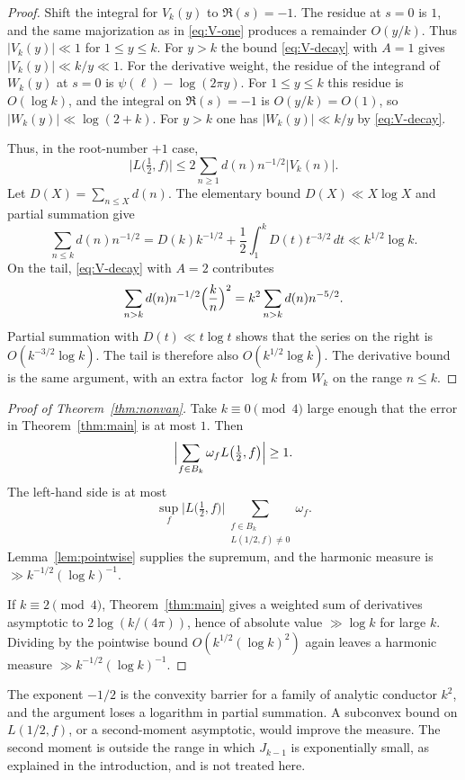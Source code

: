\documentclass[11pt]{amsart}
\theoremstyle{definition}
\theoremstyle{remark}
\numberwithin{equation}{section}
\begin{document}
\begin{proof}
Shift the integral for $V_k(y)$ to $\Re(s)=-1$. The residue at $s=0$ is $1$, and the same majorization as in \eqref{eq:V-one} produces a remainder $O(y/k)$. Thus $\lvert V_k(y)\rvert\ll 1$ for $1\le y\le k$. For $y>k$ the bound \eqref{eq:V-decay} with $A=1$ gives $\lvert V_k(y)\rvert\ll k/y\ll 1$. For the derivative weight, the residue of the integrand of $W_k(y)$ at $s=0$ is $\psi(\ell)-\log(2\pi y)$. For $1\le y\le k$ this residue is $O(\log k)$, and the integral on $\Re(s)=-1$ is $O(y/k)=O(1)$, so $\lvert W_k(y)\rvert\ll\log(2+k)$. For $y>k$ one has $\lvert W_k(y)\rvert\ll k/y$ by \eqref{eq:V-decay}.

Thus, in the root-number $+1$ case,
\[
\bigl\lvert L\bigl(\tfrac12,f\bigr)\bigr\rvert
\le 2\sum_{n\ge 1}d(n)n^{-1/2}\lvert V_k(n)\rvert.
\]
Let $D(X)=\sum_{n\le X}d(n)$. The elementary bound $D(X)\ll X\log X$ and partial summation give
\[
\sum_{n\le k}d(n)n^{-1/2}
=D(k)k^{-1/2}+\frac12\int_1^k D(t)t^{-3/2}\,dt
\ll k^{1/2}\log k.
\]
On the tail, \eqref{eq:V-decay} with $A=2$ contributes
\[
\sum_{n>k}d(n)n^{-1/2}\Bigl(\frac kn\Bigr)^2
=k^2\sum_{n>k}d(n)n^{-5/2}.
\]
Partial summation with $D(t)\ll t\log t$ shows that the series on the right is $O(k^{-3/2}\log k)$.
The tail is therefore also $O(k^{1/2}\log k)$.
The derivative bound is the same argument, with an extra factor $\log k$ from $W_k$ on the range $n\le k$.
\end{proof}

\begin{proof}[Proof of Theorem~\ref{thm:nonvan}]
Take $k\equiv 0\pmod 4$ large enough that the error in Theorem~\ref{thm:main} is at most $1$. Then
\[
\Bigl\lvert\sum_{f\in B_k}\omega_f L\bigl(\tfrac12,f\bigr)\Bigr\rvert\ge 1.
\]
The left-hand side is at most
\[
\sup_f\bigl\lvert L\bigl(\tfrac12,f\bigr)\bigr\rvert
\sum_{\substack{f\in B_k\\ L(1/2,f)\ne 0}}\omega_f.
\]
Lemma~\ref{lem:pointwise} supplies the supremum, and the harmonic measure is $\gg k^{-1/2}(\log k)^{-1}$.

If $k\equiv 2\pmod 4$, Theorem~\ref{thm:main} gives a weighted sum of derivatives asymptotic to $2\log(k/(4\pi))$, hence of absolute value $\gg\log k$ for large $k$. Dividing by the pointwise bound $O(k^{1/2}(\log k)^2)$ again leaves a harmonic measure $\gg k^{-1/2}(\log k)^{-1}$.
\end{proof}

The exponent $-1/2$ is the convexity barrier for a family of analytic conductor $k^2$, and the argument loses a logarithm in partial summation. A subconvex bound on $L(1/2,f)$, or a second-moment asymptotic, would improve the measure. The second moment is outside the range in which $J_{k-1}$ is exponentially small, as explained in the introduction, and is not treated here.
\end{document}
